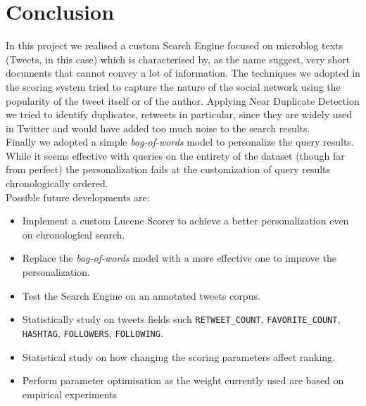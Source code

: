 \documentclass[a4paper,12pt,openany,oneside]{article}
\begin{document}





\newpage
\section{Conclusion}

In this project we realised a custom Search Engine focused on microblog texts (Tweets, in this case) which is characterised by, as the name suggest, very short documents that cannot convey a lot of information. The techniques we adopted in the scoring system tried to capture the nature of the social network using the popularity of the tweet itself or of the author. Applying Near Duplicate Detection we tried to identify duplicates, retweets in particular, since they are widely used in Twitter and would have added too much noise to the search results.
\\[0.8em]
Finally we adopted a simple \textit{bag-of-words} model to personalize the query results. While it seems effective with queries on the entirety of the dataset (though far from perfect) the personalization fails at the customization of query results chronologically ordered.
\\[0.8em]
Possible future developments are:
\begin{itemize}
    \item Implement a custom Lucene Scorer to achieve a better personalization even on chronological search.
    \item Replace the \textit{bag-of-words} model with a more effective one to improve the personalization.
    \item Test the Search Engine on an annotated tweets corpus.
    \item Statistically study on tweets fields such \verb|RETWEET_COUNT|, \verb|FAVORITE_COUNT|, \verb|HASHTAG|, \verb|FOLLOWERS|, \verb|FOLLOWING|.
    \item Statistical study on how changing the scoring parameters affect ranking.
    \item Perform parameter optimisation as the weight currently used are based on empirical experiments
\end{itemize}
\end{document}

